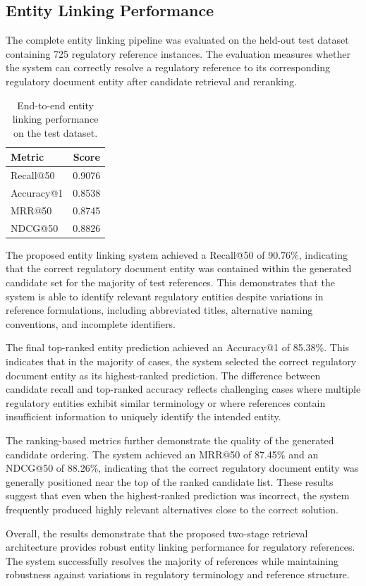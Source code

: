 \subsection{Entity Linking Performance}

The complete entity linking pipeline was evaluated on the held-out test dataset containing 725 regulatory reference instances. The evaluation measures whether the system can correctly resolve a regulatory reference to its corresponding regulatory document entity after candidate retrieval and reranking.

\begin{table}[H]
\centering
\caption{End-to-end entity linking performance on the test dataset.}
\label{tab:entity_linking_performance}
\begin{tabular}{lc}
\hline
\textbf{Metric} & \textbf{Score} \\
\hline
Recall@50 & 0.9076 \\
Accuracy@1 & 0.8538 \\
MRR@50 & 0.8745 \\
NDCG@50 & 0.8826 \\
\hline
\end{tabular}
\end{table}

The proposed entity linking system achieved a Recall@50 of 90.76\%, indicating that the correct regulatory document entity was contained within the generated candidate set for the majority of test references. This demonstrates that the system is able to identify relevant regulatory entities despite variations in reference formulations, including abbreviated titles, alternative naming conventions, and incomplete identifiers.

The final top-ranked entity prediction achieved an Accuracy@1 of 85.38\%. This indicates that in the majority of cases, the system selected the correct regulatory document entity as its highest-ranked prediction. The difference between candidate recall and top-ranked accuracy reflects challenging cases where multiple regulatory entities exhibit similar terminology or where references contain insufficient information to uniquely identify the intended entity.

The ranking-based metrics further demonstrate the quality of the generated candidate ordering. The system achieved an MRR@50 of 87.45\% and an NDCG@50 of 88.26\%, indicating that the correct regulatory document entity was generally positioned near the top of the ranked candidate list. These results suggest that even when the highest-ranked prediction was incorrect, the system frequently produced highly relevant alternatives close to the correct solution.

Overall, the results demonstrate that the proposed two-stage retrieval architecture provides robust entity linking performance for regulatory references. The system successfully resolves the majority of references while maintaining robustness against variations in regulatory terminology and reference structure.